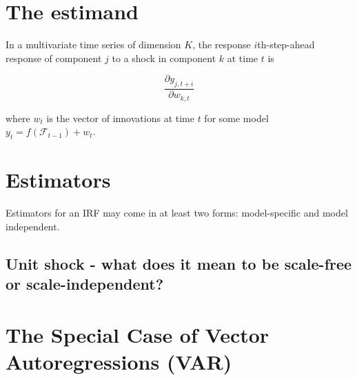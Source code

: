 \documentclass[11pt]{article}
\theoremstyle{definition}
\begin{document}
\section{The estimand}

In a multivariate time series of dimension $K$, the response $i$th-step-ahead response of component $j$ to a shock in component $k$ at time $t$ is

\[
   \frac{\partial y_{j,t+i}}{\partial w_{k,t}}
\]

where $w_{t}$ is the vector of innovations at time $t$ for some model $y_{t} = f(\mathcal{F}_{t-1}) + w_{t}$.

\section{Estimators}

Estimators for an IRF may come in at least two forms: model-specific and model independent.

\subsection{Unit shock - what does it mean to be scale-free or scale-independent?}

\section{The Special Case of Vector Autoregressions (VAR)}



  
\end{document}
